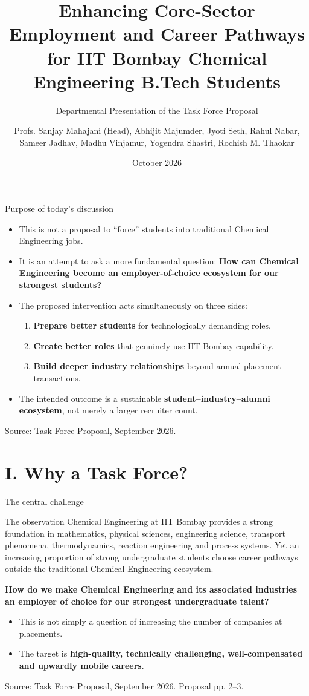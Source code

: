\documentclass[aspectratio=169,11pt]{beamer}
\title{Enhancing Core-Sector Employment and Career Pathways\\for IIT Bombay Chemical Engineering B.Tech Students}
\subtitle{Departmental Presentation of the Task Force Proposal}
\author{Profs. Sanjay Mahajani (Head), Abhijit Majumder, Jyoti Seth,  Rahul Nabar, Sameer Jadhav,  Madhu Vinjamur, Yogendra Shastri, Rochish M. Thaokar}
\institute{Department of Chemical Engineering\\Indian Institute of Technology Bombay}
\date{October 2026}
\newcommand{\key}[1]{\textbf{\color{IITblue}#1}}
\newcommand{\sourcefoot}[1]{\vfill\tiny\color{gray}Source: Task Force Proposal, September 2026. #1}
\begin{document}
\begin{frame}
  \titlepage
\end{frame}

\begin{frame}{Purpose of today's discussion}
\begin{itemize}
\item This is not a proposal to ``force'' students into traditional Chemical Engineering jobs.
\item It is an attempt to ask a more fundamental question: \key{How can Chemical Engineering become an employer-of-choice ecosystem for our strongest students?}
\item The proposed intervention acts simultaneously on three sides:
  \begin{enumerate}
  \item \key{Prepare better students} for technologically demanding roles.
  \item \key{Create better roles} that genuinely use IIT Bombay capability.
  \item \key{Build deeper industry relationships} beyond annual placement transactions.
  \end{enumerate}
\item The intended outcome is a sustainable \key{student--industry--alumni ecosystem}, not merely a larger recruiter count.
\end{itemize}
\sourcefoot{}
\end{frame}

\section{I. Why a Task Force?}
\begin{frame}{The central challenge}
\begin{block}{The observation}
Chemical Engineering at IIT Bombay provides a strong foundation in mathematics, physical sciences, engineering science, transport phenomena, thermodynamics, reaction engineering and process systems. Yet an increasing proportion of strong undergraduate students choose career pathways outside the traditional Chemical Engineering ecosystem.
\end{block}
\vspace{4mm}
\begin{center}
\Large\key{How do we make Chemical Engineering and its associated industries an employer of choice for our strongest undergraduate talent?}
\end{center}
\vspace{3mm}
\begin{itemize}
\item This is not simply a question of increasing the number of companies at placements.
\item The target is \key{high-quality, technically challenging, well-compensated and upwardly mobile careers}.
\end{itemize}
\sourcefoot{Proposal pp. 2--3.}
\end{frame}
\end{document}

